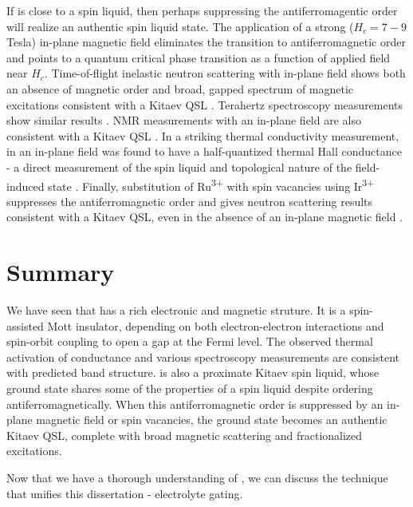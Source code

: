 If \rucl is close to a spin liquid, then perhaps suppressing the antiferromagentic order will realize an authentic spin liquid state. 	The application of a strong ($H_{c} = 7-9$ Tesla) in-plane magnetic field eliminates the transition to antiferromagnetic order and points to a quantum critical phase transition as a function of applied field near $H_{c}$. Time-of-flight inelastic neutron scattering with in-plane field shows both an absence of magnetic order and broad, gapped spectrum of magnetic excitations consistent with a Kitaev QSL \cite{Banerjee2017}. Terahertz spectroscopy measurements show similar results \cite{Wang2017}. NMR measurements with an in-plane field are also consistent with a Kitaev QSL \cite{Baek2017}. In a striking thermal conductivity measurement, \rucl in an in-plane field was found to have a half-quantized thermal Hall conductance - a direct measurement of the spin liquid and topological nature of the field-induced state \cite{Kasahara2018}. Finally, substitution of Ru\textsuperscript{3+} with spin vacancies using Ir\textsuperscript{3+} suppresses the antiferromagnetic order and gives neutron scattering results consistent with a Kitaev QSL, even in the absence of an in-plane magnetic field \cite{Lampen-Kelley2017}.

\section{Summary}

We have seen that \ruclnospace has a rich electronic and magnetic struture. It is a spin-assisted Mott insulator, depending on both electron-electron interactions and spin-orbit coupling to open a gap at the Fermi level. The observed thermal activation of conductance and various spectroscopy measurements are consistent with predicted band structure. \rucl is also a proximate Kitaev spin liquid, whose ground state shares some of the properties of a spin liquid despite ordering antiferromagnetically. When this antiferromagnetic order is suppressed by an in-plane magnetic field or spin vacancies, the ground state becomes an authentic Kitaev QSL, complete with broad magnetic scattering and fractionalized excitations.

Now that we have a thorough understanding of \ruclnospace , we can discuss the technique that unifies this dissertation - electrolyte gating.